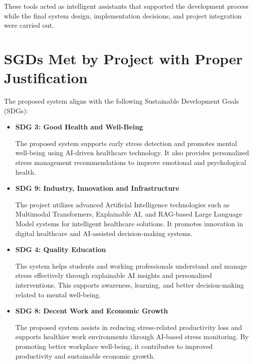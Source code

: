 \documentclass[12pt,a4paper]{report}
\begin{document}
These tools acted as intelligent assistants that supported the development process while the final system design, implementation decisions, and project integration were carried out.

\chapter{SGDs Met by Project with Proper Justification}

The proposed system aligns with the following Sustainable Development Goals (SDGs):

\begin{itemize}
    \item \textbf{SDG 3: Good Health and Well-Being}
    
    The proposed system supports early stress detection and promotes mental well-being using AI-driven healthcare technology. It also provides personalized stress management recommendations to improve emotional and psychological health.

    \item \textbf{SDG 9: Industry, Innovation and Infrastructure}
    
    The project utilizes advanced Artificial Intelligence technologies such as Multimodal Transformers, Explainable AI, and RAG-based Large Language Model systems for intelligent healthcare solutions. It promotes innovation in digital healthcare and AI-assisted decision-making systems.

    \item \textbf{SDG 4: Quality Education}
    
    The system helps students and working professionals understand and manage stress effectively through explainable AI insights and personalized interventions. This supports awareness, learning, and better decision-making related to mental well-being.

    \item \textbf{SDG 8: Decent Work and Economic Growth}
    
    The proposed system assists in reducing stress-related productivity loss and supports healthier work environments through AI-based stress monitoring. By promoting better workplace well-being, it contributes to improved productivity and sustainable economic growth.
\end{itemize}

\end{document}
